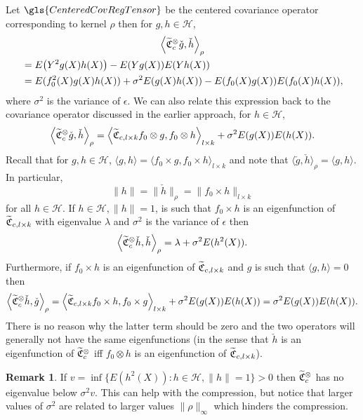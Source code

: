 \documentclass[10pt]{amsart}
\theoremstyle{definition}\newtheorem{defi}[theo]{Definition}\newtheorem{rema}[theo]{Remark}\newtheorem{exam}[theo]{Example}\newtheorem{exem}[theo]{Example}\newtheorem{nota}[theo]{Notation}
\theoremstyle{remark}
\newcommand{\cH}{\mathcal{H}}
\newcommand{\fkC}{\mathfrak{C}}
\let\oldtilde\tilde
\renewcommand*{\tilde}[1]{\mathchoice{\widetilde{#1}}{\widetilde{#1}}{\oldtilde{#1}}{\oldtilde{#1}}}
\let\originalleft\left
\let\originalright\right
\renewcommand{\left}{\mathopen{}\mathclose\bgroup\originalleft}
\renewcommand{\right}{\aftergroup\egroup\originalright}
\begin{document}
Let $\gls{CenteredCovRegTensor}$ be the centered covariance operator corresponding to kernel $\rho$ then for $g,h \in \cH$,
\begin{multline*}
\left\langle \tilde{\fkC}^\otimes_c \check g,\check h \right\rangle_\rho\\
\begin{aligned}
&= E\left(Y^2 g(X) h(X)\right) - E(Y g(X)) E(Y h(X))\\
&= E(f_0^2(X) g(X) h(X)) + \sigma^2 E(g(X) h(X)) - E(f_0(X) g(X)) E(f_0(X) h(X)),
\end{aligned}
\end{multline*}
where $\sigma^2$ is the variance of $\epsilon$. We can also relate this expression back to the covariance operator discussed in the earlier approach, for $h\in \cH$,
\[
\left\langle \tilde{\fkC}^\otimes_c \check g,\check h \right\rangle_\rho = \left\langle \tilde{\fkC}_{c,l\times k} f_0 \otimes g, f_0 \otimes h \right\rangle_{l\times k} + \sigma^2 E(g(X)) E(h(X)).
\]
Recall that for $g,h \in \cH$, $\langle g, h \rangle = \langle f_0 \times g, f_0 \times h \rangle_{l\times k}$ and note that $\langle \check g, \check h \rangle_\rho = \langle g,h \rangle$. In particular,
\begin{equation}\label{eq:norms_equiv}
\|h \| = \|\check h\|_\rho = \|f_0 \times h\|_{l \times k}
\end{equation}
for all $h\in \cH$. If $h\in \cH, \|h\|=1$, is such that $f_0 \times h$ is an eigenfunction of $\tilde{\fkC}_{c,l \times k}$ with eigenvalue $\lambda$ and $\sigma^2$ is the variance of $\epsilon$ then
\[
\left\langle \tilde{\fkC}^\otimes_c \check h,\check h \right\rangle_\rho = \lambda + \sigma^2 E(h^2(X)).
\]
Furthermore, if $f_0 \times h$ is an eigenfunction of $\tilde{\fkC}_{c,l \times k}$ and $g$ is such that $\langle g, h \rangle = 0$ then
\[
\left\langle \tilde{\fkC}^\otimes_c \check h,\check g \right\rangle_\rho = \left\langle \tilde{\fkC}_{c,l \times k} f_0 \times h, f_0 \times g \right\rangle_{l\times k} + \sigma^2 E(g(X)) E(h(X)) = \sigma^2 E(g(X)) E(h(X)).
\]
There is no reason why the latter term should be zero and the two operators will generally not have the same eigenfunctions (in the sense that $\check h$ is an eigenfunction of $\tilde{\fkC}^\otimes_c$ iff $f_0 \otimes h$ is an eigenfunction of $\tilde{\fkC}_{c,l \times k}$).

\begin{rema}\label{remark:lowest_EV_product}
If $v = \inf \{ E(h^2(X)) : h \in \cH, \|h \|=1\} > 0$ then $\tilde{\fkC}^\otimes_c$ has no eigenvalue below $\sigma^2 v$. This can help with the compression, but notice that larger values of $\sigma^2$ are related to larger values $\|\rho\|_\infty$ which hinders the compression.
\end{rema}
\end{document}
